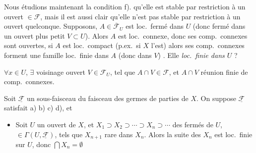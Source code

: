 \documentclass[11pt,a4paper]{article}
\begin{document}
Nous étudions maintenant la condition f). 
 qu'elle est stable par restriction à un ouvert $\in
\mathcal{F}$, mais il est aussi clair qu'elle n'est pas stable par
restriction à un ouvert quelconque. Supposons,  
$A \in \overline{\mathcal{F}}_U$ est loc.\ fermé dans $U$ (donc fermé dans un
ouvert plus petit $V \subset U$). Alors $A$ est loc.\ connexe,  donc ses comp.\ connexes sont ouvertes, si $A$ est loc.\ compact
(p.ex.\ si $X$ l'est) alors ses comp.\ connexes forment  une
famille loc.\ finie dans $A$ (donc dans $V$) \struck{\ill{}}. Elle
 \emph{loc.\ finie dans $U$} ?


\ill{} $\forall x \in U$, $\exists$ voisinage ouvert $V \in
\mathcal{F}_U$, tel que $A \cap V \in \mathcal{F}$, et $A \cap V$ réunion
finie de comp.\ connexes.


Soit $\underline{\mathcal{F}}$ un sous-faisceau du faisceau des germes de
parties de $X$. On suppose $\underline{\mathcal{F}}$ satisfait a) b) c) d),
et \struck{\ill{}} 
\begin{itemize}
  \item[e)] Soit $U$ un ouvert de $X$, et $X_1 \supset X_2
  \supset \cdots \supset X_n \supset \cdots$ des fermés de $U$, $\in
  \Gamma(U, \underline{\mathcal{F}})$, tels que $X_{n+1}$ rare dans $X_n$.
  Alors la suite des $X_n$ est loc.\ finie sur $U$, donc $\bigcap X_n =
  \emptyset$
\end{itemize}
\end{document}
